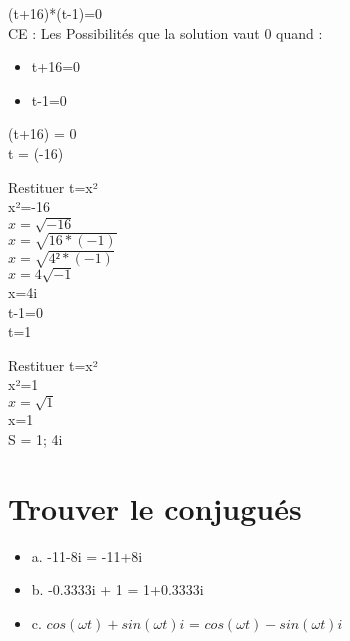 (t+16)*(t-1)=0 \\


CE : Les Possibilités que la solution vaut 0 quand :

\begin{itemize}
\item {t+16=0}
\item {t-1=0}
\end{itemize}

(t+16) = 0 \\

t = (-16) \\

\vspace{5mm}

Restituer t=x² \\

x²=-16 \\

$x=\sqrt{-16}$ \\

$x=\sqrt{16 * (-1)}$ \\

$x=\sqrt{4² * (-1)}$ \\

$x=4\sqrt{-1}$ \\

x=4i \\

t-1=0 \\
t=1 \\

\vspace{5mm}

Restituer t=x² \\

x²=1 \\
$x=\sqrt{1}$ \\
x=1 \\


S = 1; 4i \\

\newpage

\section{Trouver le conjugués}

\begin{itemize}
\item {a. -11-8i = -11+8i}
\item {b. -0.3333i + 1 = 1+0.3333i}
\item {c. $cos(\omega t) + sin(\omega t)i$ = $cos(\omega t) - sin(\omega t)i$ }
\end{itemize}


